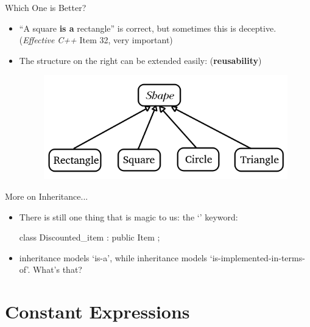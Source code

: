 \documentclass{beamer}
\begin{document}
\begin{frame}{Which One is Better?}
    \begin{itemize}
        \item ``A square \textbf{is a} rectangle'' is correct, but sometimes this is deceptive. (\textit{Effective C++} Item 32, very important)
        \item The structure on the right can be extended easily: (\textbf{reusability})
        \begin{figure}[h]
            \centering
            \includegraphics[scale=0.6]{figures/shape_extended.png}
        \end{figure}
    \end{itemize}
\end{frame}

\begin{frame}[fragile]{More on Inheritance...}
    \begin{itemize}
        \item There is still one thing that is magic to us: the `' keyword:
        \begin{cpp}
class Discounted_item : public Item {};
        \end{cpp}
        \item \public inheritance models `is-a', while \private inheritance models `is-implemented-in-terms-of'. What's that?
    \end{itemize}
\end{frame}

\section{Constant Expressions}
\end{document}
